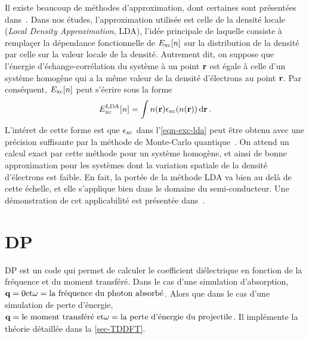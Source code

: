 Il existe beaucoup de méthodes d'approximation,
dont certaines sont présentées dans~\cite{Sottile2003}.
Dans nos études, l'approximation utilisée est celle de la densité locale (\textit{Local Density Approximation}, LDA),
l'idée principale de laquelle consiste à remplaçer la dépendance fonctionnelle de $E_{\textnormal{xc}}[n]$
sur la distribution de la densité par celle sur la valeur locale de la densité.
Autrement dit, on suppose que l'énergie d'échange-corrélation du système à un point $\vb{r}$
est égale à celle d'un système homogène qui a la même valeur de la densité d'électrons au point $\vb{r}$.
Par conséquent, $E_{\textnormal{xc}}[n]$ peut s'écrire sous la forme
\begin{equation}
  \label{eqn-exc-lda}
  E_{\textnormal{xc}}^{\textnormal{LDA}}[n] = \int n(\vb{r})\epsilon_{\textnormal{xc}}(n(\vb{r})) \dd{\vb{r}}.
\end{equation}
L'intéret de cette forme est que $\epsilon_{\textnormal{xc}}$ dans l'\cref{eqn-exc-lda} peut être obtenu avec
une précision suffisante par la méthode de Monte-Carlo quantique~\cite{ceperley1980}.
On attend un calcul exact par cette méthode pour un système homogène,
et ainsi de bonne approximation pour les systèmes dont la variation spatiale de la densité d'électrons est faible.
En fait, la portée de la méthode LDA va bien au delà de cette échelle,
et elle s'applique bien dans le domaine du semi-conducteur.
Une démonstration de cet applicabilité est présentée dans~\cite{Sottile2003}.

\section{DP}
DP est un code qui permet de calculer le coefficient diélectrique
en fonction de la fréquence et du moment transféré.
Dans le cas d'une simulation d'absorption,
$\vb{q}=0 \text{et} \omega = \text{la fréquence du photon absorbé}$.
Alors que dans le cas d'une simulation de perte d'énergie,
$\vb{q}= \text{le moment transféré et} \omega = \text{la perte d'énergie du projectile}$.
Il implémente la théorie détaillée dans la \cref{sec-TDDFT}.

